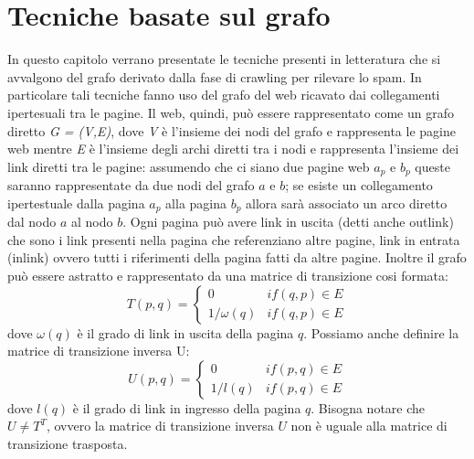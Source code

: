 \chapter{Tecniche basate sul grafo}
In questo capitolo verrano presentate le tecniche presenti in letteratura che si avvalgono del grafo derivato dalla fase di crawling per rilevare lo spam. In particolare tali tecniche fanno uso del grafo del web ricavato dai collegamenti ipertesuali tra le pagine. Il web, quindi, può essere rappresentato come un grafo diretto \textit{G = (V,E)}, dove \textit{V} è l'insieme dei nodi del grafo e rappresenta le pagine web mentre \textit{E} è l'insieme degli archi  diretti tra i nodi e rappresenta l'insieme dei link diretti tra le pagine: assumendo che ci siano due pagine web \(a_p\) e \(b_p\) queste saranno rappresentate da due nodi del grafo \(a\) e \(b\); se esiste un collegamento ipertestuale  dalla pagina \(a_p\) alla pagina \(b_p\) allora sarà associato un arco diretto dal nodo \(a\) al nodo \(b\). Ogni pagina può avere link in uscita (detti anche outlink)  che sono i link presenti nella pagina che referenziano altre pagine, link in entrata (inlink) ovvero tutti i riferimenti della pagina fatti da altre 
pagine. Inoltre il grafo può essere astratto e rappresentato da una matrice di transizione cosi formata:
\begin{equation}
T(p,q)=\left \{
\begin{array}{cc}
0 & if(q,p) \in E\\
1/\omega(q) & if(q,p) \in E
\end{array}
\right .
\end{equation}
dove \(\omega(q)\) è il grado di link in uscita della pagina \(q\). 
Possiamo anche definire la matrice di transizione inversa U:
\begin{equation}
U(p,q)=\left \{
\begin{array}{cc}
0 & if(p,q) \in E\\
1/l(q) & if(p,q) \in E
\end{array}
\right .
\end{equation}
dove \(l(q)\) è il grado di link in ingresso della pagina \(q\). Bisogna notare che \(U \not = T^T\), ovvero la matrice di transizione inversa \(U\) non è uguale alla matrice di transizione trasposta.
